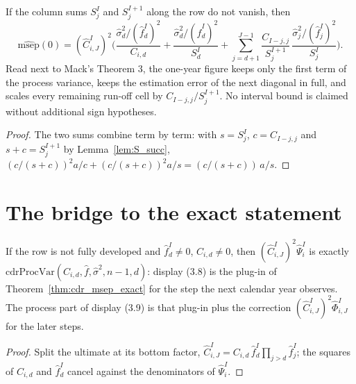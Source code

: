 \begin{theorem}[Display (3.17)]\label{thm:mw_display}\leanok
{}
If the column sums $S^I_j$ and $S^{I+1}_j$ along the row do not vanish, then
\[
 \widehat{\mathrm{msep}}(0) = (\hat C^I_{i,J})^2\Big(
  \frac{\hat\sigma^2_{d}/(\hat f^I_{d})^2}{C_{i,d}}
  + \frac{\hat\sigma^2_{d}/(\hat f^I_{d})^2}{S^I_{d}}
  + \sum_{j=d+1}^{J-1}\frac{C_{I-j,j}}{S^{I+1}_j}\,
     \frac{\hat\sigma^2_j/(\hat f^I_j)^2}{S^I_j}\Big).
\]
Read next to Mack's Theorem 3, the one-year figure keeps only the first term of the process
variance, keeps the estimation error of the next diagonal in full, and scales every remaining
run-off cell by $C_{I-j,j}/S^{I+1}_j$. No interval bound is claimed without additional sign
hypotheses.
\end{theorem}
\begin{proof}\leanok
The two sums combine term by term: with $s = S^I_j$, $c = C_{I-j,j}$ and $s + c = S^{I+1}_j$ by
Lemma~\ref{lem:S_succ}, $(c/(s+c))^2 a/c + (c/(s+c))^2 a/s = (c/(s+c))\,a/s$.
\end{proof}

\section{The bridge to the exact statement}

\begin{theorem}\label{thm:mw_plugin}\leanok
{}
If the row is not fully developed and $\hat f^I_{d} \neq 0$, $C_{i,d} \neq 0$, then
$(\hat C^I_{i,J})^2\hat\Psi^I_i$ is exactly
$\mathrm{cdrProcVar}(C_{i,d}, \hat f, \hat\sigma^2, n-1, d)$: display (3.8) is the plug-in of
Theorem~\ref{thm:cdr_msep_exact} for the step the next calendar year observes. The process part of
display (3.9) is that plug-in plus the correction $(\hat C^I_{i,J})^2\hat\Phi^I_{i,J}$ for the
later steps.
\end{theorem}
\begin{proof}\leanok
Split the ultimate at its bottom factor, $\hat C^I_{i,J} = C_{i,d}\,\hat f^I_d \prod_{j>d}\hat f^I_j$;
the squares of $C_{i,d}$ and $\hat f^I_d$ cancel against the denominators of $\hat\Psi^I_i$.
\end{proof}

